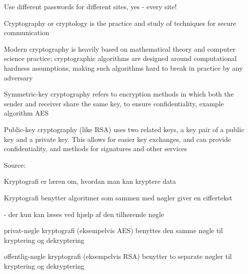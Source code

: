 \documentclass[Screen16to9,17pt]{foils}
\begin{document}
\vskip 5mm
\centerline{Use different passwords for different sites, yes - every site!}




\begin{list1}
\item Cryptography or cryptology is the practice and study of techniques for secure communication
\item Modern cryptography is heavily based on mathematical theory and computer science practice; cryptographic algorithms are designed around computational hardness assumptions, making such algorithms hard to break in practice by any adversary
\item Symmetric-key cryptography refers to encryption methods in which both the sender and receiver share the same key, to ensure confidentiality, example algorithm AES
\item Public-key cryptography (like RSA) uses two related keys, a key pair of a public key and a private key. This allows for easier key exchanges, and can provide confidentiality, and methods for signatures and other services
\end{list1}

Source: 





\begin{list1}
\item Kryptografi er læren om, hvordan man kan kryptere data
\item Kryptografi benytter algoritmer som sammen med nøgler giver en
  ciffertekst
\item  - der kun kan læses ved hjælp af den tilhørende nøgle
\end{list1}



\begin{list1}
\item privat-nøgle kryptografi (eksempelvis AES) benyttes den samme
  nøgle til kryptering og dekryptering
\item offentlig-nøgle kryptografi (eksempelvis RSA) benytter to
  separate nøgler til kryptering og dekryptering
\end{list1}
\end{document}
